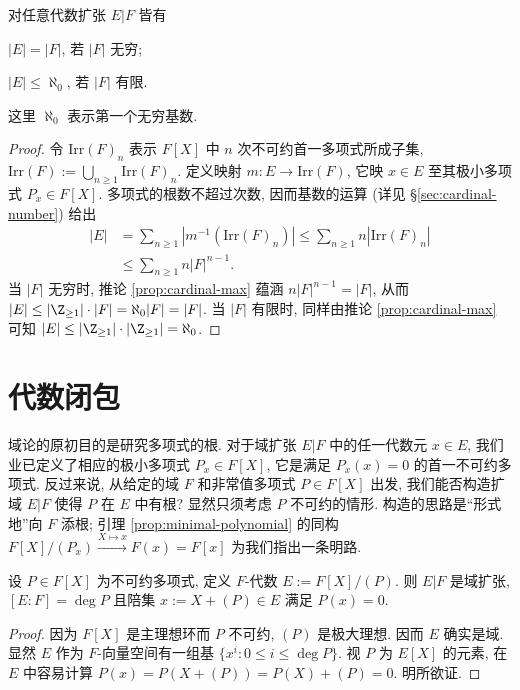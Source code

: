 \begin{proposition}\label{prop:alg-ext-cardinality}
	对任意代数扩张 $E|F$ 皆有
	\begin{compactitem}
		\item $|E|=|F|$, 若 $|F|$ 无穷;
		\item $|E| \leq \aleph_0$, 若 $|F|$ 有限.
	\end{compactitem}
	这里 $\aleph_0$ 表示第一个无穷基数.
\end{proposition}
\begin{proof}
	令 $\text{Irr}(F)_n$ 表示 $F[X]$ 中 $n$ 次不可约首一多项式所成子集, $\text{Irr}(F) := \displaystyle\bigcup_{n \geq 1} \text{Irr}(F)_n$. 定义映射 $m: E \to \text{Irr}(F)$, 它映 $x \in E$ 至其极小多项式 $P_x \in F[X]$. 多项式的根数不超过次数, 因而基数的运算 (详见 \S\ref{sec:cardinal-number}) 给出
	\begin{align*}
		|E| & = \sum_{n \geq 1} \left| m^{-1}(\text{Irr}(F)_n) \right| \leq \sum_{n \geq 1} n \left| \text{Irr}(F)_n \right| \\
		& \leq \sum_{n \geq 1} n |F|^{n-1}.
	\end{align*}
	当 $|F|$ 无穷时, 推论 \ref{prop:cardinal-max} 蕴涵 $n|F|^{n-1} = |F|$, 从而 $|E| \leq |\Z_{\geq 1}| \cdot |F| = \aleph_0 |F| = |F|$. 当 $|F|$ 有限时, 同样由推论 \ref{prop:cardinal-max} 可知 $|E| \leq |\Z_{\geq 1}| \cdot |\Z_{\geq 1}| = \aleph_0$.
\end{proof}

\section{代数闭包}
域论的原初目的是研究多项式的根. 对于域扩张 $E|F$ 中的任一代数元 $x \in E$, 我们业已定义了相应的极小多项式 $P_x \in F[X]$, 它是满足 $P_x(x)=0$ 的首一不可约多项式. 反过来说, 从给定的域 $F$ 和非常值多项式 $P \in F[X]$ 出发, 我们能否构造扩域 $E|F$ 使得 $P$ 在 $E$ 中有根? 显然只须考虑 $P$ 不可约的情形. 构造的思路是``形式地''向 $F$ 添根; 引理 \ref{prop:minimal-polynomial} 的同构 $F[X]/(P_x) \xrightarrow{X \mapsto x} F(x)=F[x]$ 为我们指出一条明路.

\begin{proposition}[L.\ Kronecker]\label{prop:adjunction-root}
	设 $P \in F[X]$ 为不可约多项式, 定义 $F$-代数 $E := F[X]/(P)$. 则 $E|F$ 是域扩张, $[E:F] = \deg P$ 且陪集 $x := X + (P) \in E$ 满足 $P(x)=0$.
\end{proposition}
\begin{proof}
	因为 $F[X]$ 是主理想环而 $P$ 不可约, $(P)$ 是极大理想. 因而 $E$ 确实是域. 显然 $E$ 作为 $F$-向量空间有一组基 $\{ x^i : 0 \leq i \leq \deg P \}$. 视 $P$ 为 $E[X]$ 的元素, 在 $E$ 中容易计算 $P(x) = P(X + (P)) = P(X) + (P) = 0$. 明所欲证.
\end{proof}

